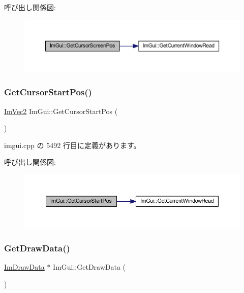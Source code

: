 呼び出し関係図\+:\nopagebreak
\begin{figure}[H]
\begin{center}
\leavevmode
\includegraphics[width=350pt]{namespace_im_gui_adb0db3c1ee36f5085f35890a4229ae75_cgraph}
\end{center}
\end{figure}
\mbox{\label{namespace_im_gui_a8ee9647de3b39fc7b77395082fc9e0cc}} 
\subsubsection{\texorpdfstring{Get\+Cursor\+Start\+Pos()}{GetCursorStartPos()}}
{\footnotesize\ttfamily \mbox{\hyperlink{struct_im_vec2}{Im\+Vec2}} Im\+Gui\+::\+Get\+Cursor\+Start\+Pos (\begin{DoxyParamCaption}{ }\end{DoxyParamCaption})}



 imgui.\+cpp の 5492 行目に定義があります。

呼び出し関係図\+:\nopagebreak
\begin{figure}[H]
\begin{center}
\leavevmode
\includegraphics[width=350pt]{namespace_im_gui_a8ee9647de3b39fc7b77395082fc9e0cc_cgraph}
\end{center}
\end{figure}
\mbox{\label{namespace_im_gui_ab73131dc44b1267dac04f0c2bb0af983}} 
\subsubsection{\texorpdfstring{Get\+Draw\+Data()}{GetDrawData()}}
{\footnotesize\ttfamily \mbox{\hyperlink{struct_im_draw_data}{Im\+Draw\+Data}} $\ast$ Im\+Gui\+::\+Get\+Draw\+Data (\begin{DoxyParamCaption}{ }\end{DoxyParamCaption})}



